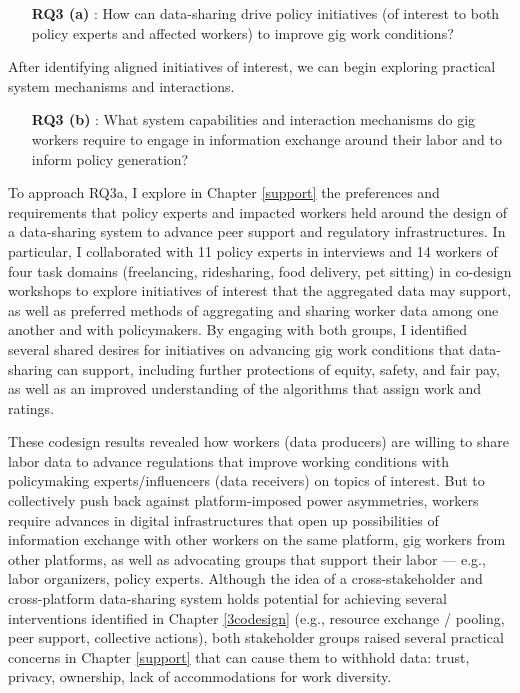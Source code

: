 \begin{enumerate}
    \item [\textbf{RQ3 (a)}]: How can data-sharing drive policy initiatives (of interest to both policy experts and affected workers) to improve gig work conditions? \cite{supporting}
\end{enumerate}

\noindent After identifying aligned initiatives of interest, we can begin exploring practical system mechanisms and interactions.

\begin{enumerate}
    \item [\textbf{RQ3 (b)}]: What system capabilities and interaction mechanisms do gig workers require to engage in information exchange around their labor and to inform policy generation? \cite{gig2gether}
\end{enumerate}

To approach RQ3a, I explore in Chapter \ref{support} the preferences and requirements that policy experts and impacted workers held around the design of a data-sharing system to advance peer support and regulatory infrastructures. In particular, I collaborated with 11 policy experts in interviews and 14 workers of four task domains (freelancing, ridesharing, food delivery, pet sitting) in co-design workshops to explore initiatives of interest that the aggregated data may support, as well as preferred methods of aggregating and sharing worker data among one another and with policymakers. By engaging with both groups, I identified several shared desires for initiatives on advancing gig work conditions that data-sharing can support, including further protections of equity, safety, and fair pay, as well as an improved understanding of the algorithms that assign work and ratings. 

These codesign results revealed how workers (data producers) are willing to share labor data to advance regulations that improve working conditions with policymaking experts/influencers (data receivers) on topics of interest. But to collectively push back against platform-imposed power asymmetries, workers require advances in digital infrastructures \cite{uuapp, policy_probes, end} that open up possibilities of information exchange with other workers on the same platform, gig workers from other platforms, as well as advocating groups that support their labor --- e.g., labor organizers, policy experts. Although the idea of a cross-stakeholder and cross-platform data-sharing system holds potential for achieving several interventions identified in Chapter \ref{3codesign} (e.g., resource exchange / pooling, peer support, collective actions), both stakeholder groups raised several practical concerns in Chapter \ref{support} that can cause them to withhold data: trust, privacy, ownership, lack of accommodations for work diversity.

